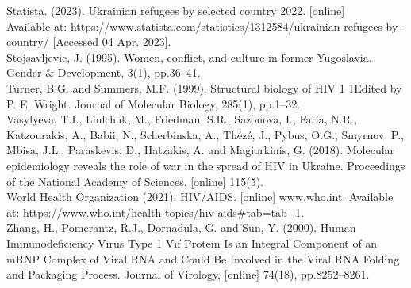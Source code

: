 Statista. (2023). Ukrainian refugees by selected country 2022. [online] \\
Available at: https://www.statista.com/statistics/1312584/ukrainian-refugees-by-country/ [Accessed 04 Apr. 2023].\\

Stojsavljevic, J. (1995). Women, conflict, and culture in former Yugoslavia. Gender & Development, 3(1), pp.36–41. \\

Turner,               B.G. and Summers, M.F. (1999). Structural biology of HIV 1 1Edited by P. E. Wright. Journal of Molecular Biology, 285(1), pp.1–32.\\

Vasylyeva, T.I., Liulchuk, M., Friedman, S.R., Sazonova, I., Faria, N.R., Katzourakis, A., Babii, N., Scherbinska, A., Thézé, J., Pybus, O.G., Smyrnov, P., Mbisa, J.L., Paraskevis, D., Hatzakis, A. and Magiorkinis, G. (2018). Molecular epidemiology reveals the role of war in the spread of HIV in Ukraine. Proceedings of the National Academy of Sciences, [online] 115(5).\\

World Health Organization (2021). HIV/AIDS. [online] www.who.int. Available at: https://www.who.int/health-topics/hiv-aids#tab=tab_1.\\

Zhang, H., Pomerantz, R.J., Dornadula, G. and Sun, Y. (2000). Human Immunodeficiency Virus Type 1 Vif Protein Is an Integral Component of an mRNP Complex of Viral RNA and Could Be Involved in the Viral RNA Folding and Packaging Process. Journal of Virology, [online] 74(18), pp.8252–8261.